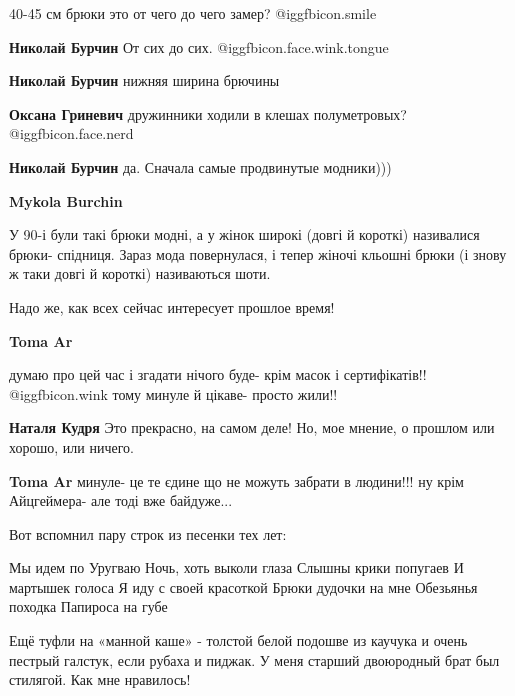 \begin{itemize}
40-45 см брюки это от чего до чего замер?  @igg{fbicon.smile} 

\begin{itemize} %
\textbf{Николай Бурчин} От сих до сих. @igg{fbicon.face.wink.tongue} 

\textbf{Николай Бурчин} нижняя ширина брючины

\textbf{Оксана Гриневич} дружинники ходили в клешах полуметровых?  @igg{fbicon.face.nerd} 

\textbf{Николай Бурчин} да. Сначала самые продвинутые модники)))

\textbf{Mykola Burchin}

У 90-і були такі брюки модні, а у жінок широкі (довгі й короткі) називалися
брюки- спідниця. Зараз мода повернулася, і тепер жіночі кльошні брюки (і знову
ж таки довгі й короткі) називаються шоти.

\end{itemize} %

Надо же, как всех сейчас интересует прошлое время!

\begin{itemize} %
\textbf{Toma Ar} 

думаю про цей час і згадати нічого буде- крім масок і сертифікатів!!
@igg{fbicon.wink}  тому минуле й цікаве- просто жили!!

\textbf{Наталя Кудря} Это прекрасно, на самом деле! Но, мое мнение, о прошлом или хорошо, или ничего.

\textbf{Toma Ar} минуле- це те єдине що не можуть забрати в людини!!! ну крім Айцгеймера- але тоді вже байдуже...
\end{itemize} %

Вот вспомнил пару строк из песенки тех лет:

\obeycr
Мы идем по Уругваю
Ночь, хоть выколи глаза
Слышны крики попугаев
И мартышек голоса
Я иду с своей красоткой
Брюки дудочки на мне
Обезьянья походка
Папироса на губе
\restorecr


Ещё туфли на «манной каше» - толстой белой подошве из каучука и очень пестрый
галстук, если рубаха и пиджак. У меня старший двоюродный брат был стилягой. Как
мне нравилось!



\end{itemize}
